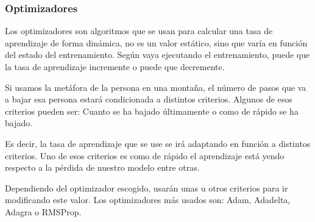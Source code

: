 \subsubsection{Optimizadores}
Los optimizadores son algoritmos que se usan para calcular una tasa de aprendizaje de forma dinámica, no es un valor estático, sino que varía en función del estado del entrenamiento. Según vaya ejecutando el entrenamiento, puede que la tasa de aprendizaje incremente o puede que decremente.
\newline

Si usamos la metáfora de la persona en una montaña, el número de pasos que va a bajar esa persona estará condicionada a distintos criterios. Algunos de esos criterios pueden ser: Cuanto se ha bajado últimamente o como de rápido se ha bajado. 
\newline

Es decir, la tasa de aprendizaje que se use se irá adaptando en función a distintos criterios. Uno de esos criterios es como de rápido el aprendizaje está yendo respecto a la pérdida de nuestro modelo entre otras.
\newline



Dependiendo del optimizador escogido, usarán unas u otros criterios para ir modificando este valor.  Los optimizadores más usados son: Adam\cite{kingma}, Adadelta\cite{zeiler}, Adagra\cite{duchi} o RMSProp\cite{duchi}.
\newline
